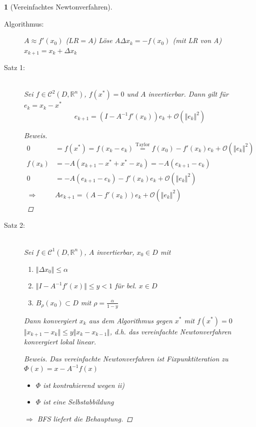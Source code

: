 \documentclass[12pt]{article}
\theoremstyle{break}
\newtheorem{nothing}[theorem]{}
\begin{document}
\begin{nothing}[Vereinfachtes Newtonverfahren] \leavevmode
\begin{description}
  \item[Algorithmus:]\leavevmode
  \begin{algorithmic}
  \STATE $A \approx f'(x_0)$ ($LR = A$)
    \STATE Löse $A \Delta x_k = -f(x_0)$ (mit LR von A)
    \STATE $x_{k+1} = x_k + \Delta x_k$
  \ENDFOR
  \end{algorithmic}
  
  \item[Satz 1:]\leavevmode\\
  Sei $f \in \mathcal{C}^2(D, \mathbb{R}^n)$, $f(x^*) = 0$ und $A$ invertierbar. Dann gilt für $e_k = x_k - x^*$
  $$e_{k+1} = (I-A^{-1}f'(x_k)) e_k + \mathcal{O}( \Vert e_k \Vert^2)$$
  \begin{proof}[Beweis]
  \begin{align*}
  0 &= f(x^*) = f(x_k-e_k) \overset{\text{Taylor}}{=} f(x_0) - f'(x_k)e_k + \mathcal{O}(\Vert e_k \Vert^2) &\\
  f(x_k) &= -A( x_{k+1} - x^* + x^* - x_k) = -A(e_{k+1} - e_k) &\\
  0 &= -A(e_{k+1} - e_k) - f'(x_k)e_k + \mathcal{O}(\Vert e_k \Vert^2) &\\
  \Rightarrow \medspace &Ae_{k+1} = (A-f'(x_k))e_k + \mathcal{O}(\Vert e_k \Vert^2)
  \end{align*}
  \end{proof}
  
  \item[Satz 2:] \leavevmode \\
  Sei $f \in \mathcal{C}^1(D, \mathbb{R}^n)$, $A$ invertierbar, $x_0 \in D$ mit 
  \renewcommand{\labelenumi}{\roman{enumi})}
  \begin{enumerate}
    \item $\Vert \Delta x_0 \Vert \leq \alpha$
    \item $\Vert I - A^{-1}f'(x) \Vert \leq y < 1$ für bel. $x \in D$
    \item $B_{\rho}(x_0) \subset D$ mit $\rho = \frac{\alpha}{1-y}$
  \end{enumerate}
  Dann konvergiert $x_k$ aus dem Algorithmus gegen $x^*$ mit $f(x^*) = 0$ $\Vert x_{k+1} -x_k \Vert \leq y \Vert x_k - x_{k-1} \Vert$, d.h. das vereinfachte Newtonverfahren konvergiert lokal linear.
  \begin{proof}[Beweis]
  Das vereinfachte Newtonverfahren ist Fixpunktiteration zu $\Phi(x) = x-A^{-1}f(x)$
  \begin{itemize}
    \item $\Phi$ ist kontrahierend wegen ii)
    \item $\Phi$ ist eine Selbstabbildung
  \end{itemize}
  $\Rightarrow$ BFS liefert die Behauptung.
  \end{proof}
\end{description}
\end{nothing}
\end{document}
